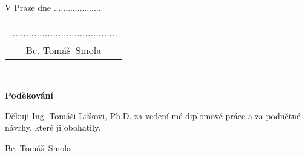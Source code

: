\documentclass[a4paper,11pt,twoside]{report}
\newcommand{\autor}{Bc. Tomáš~Smola}           %
\begin{document}
\vspace{5mm}V Praze dne ....................\hfill  %
    \begin{tabular}{c}                               %
    ........................................\\       %
    \autor                                           %
    \end{tabular}                                    %

\newpage
\thispagestyle{empty}

~
\vfill %

{\bf Poděkování}

\vspace{5mm} %
Děkuji Ing. Tomáši Liškovi, Ph.D. za vedení mé diplomové práce a za podnětné návrhy, které ji obohatily.

\begin{flushright}
\autor
\end{flushright}  %

\newpage   %
\thispagestyle{empty}   %

\newbox\odstavecbox
\newlength\vyskaodstavce
\newcommand\odstavec[2]{%
    \setbox\odstavecbox=\hbox{%
         \parbox[t]{#1}{#2\vrule width 0pt depth 4pt}}%
    \global\vyskaodstavce=\dp\odstavecbox
    \box\odstavecbox}
\newcommand{\delka}{120mm} %
\end{document}
